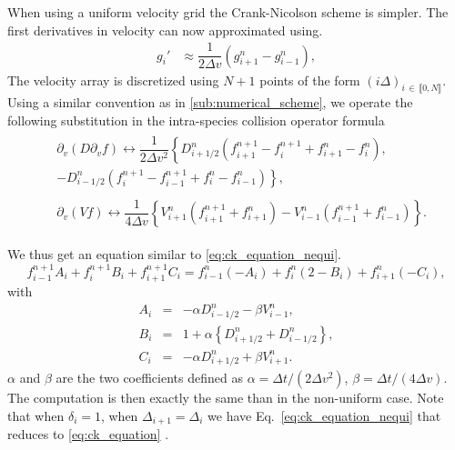 \documentclass[11pt]{article}
\begin{document}
When using a uniform velocity grid the Crank-Nicolson scheme is simpler. The first derivatives in velocity can now approximated using. 
%
\begin{align*}
   g_i' & \approx \dfrac{1}{2 \Delta v} \left( g_{i+1}^{n} - g_{i-1}^{n} \right),   \label{eq:derivativee_scheme}
\end{align*}
The velocity array is discretized using $N +1$ points of the form  $(i\Delta)_{i \, \in \, \llbracket 0, N \rrbracket }$. Using a similar convention as in \cref{sub:numerical_scheme}, we operate the following substitution in the intra-species collision operator formula
%
\begin{align}
 & \begin{aligned}
    \partial_{v} (D \partial_{v}f )\longleftrightarrow \dfrac{1}{2 \Delta v^2}\left\{D_{i + 1/2}^{n}  \left( f_{i+1}^{n+1} - f_{i}^{n+1} + f_{i+1}^{n} - f_{i}^{n} \right) \right., & \\
    - \left. D_{i - 1/2}^{n}\left( f_{i}^{n+1} - f_{i-1}^{n+1} + f_{i}^{n} - f_{i-1}^{n} \right) \right\},
  \end{aligned} \\
 & 
 \begin{aligned}
   \partial_{v} (V f) \longleftrightarrow \dfrac{1}{4 \Delta v} \left\{ V_{i+1}^{n} (f_{i+1}^{n+1} + f_{i+1}^{n}) - V_{i-1}^{n}(f_{i-1}^{n+1} + f_{i-1}^{n}) \right\}.
 \end{aligned}
\end{align}

%
We thus get an equation similar to \cref{eq:ck_equation_nequi}.
%
\begin{equation}\label{eq:ck_equation}
  f_{i-1}^{n+1} A_i + f_i^{n+1} B_i + f_{i+1}^{n+1} C_i = f_{i-1}^{n}(-A_i) + f_i^{n} (2 - B_i) + f_{i+1}^{n}(-C_i),
\end{equation}
%
with
%
\begin{eqnarray}
  A_i &=& - \alpha D^{n}_{i - 1/2} - \beta V^{n}_{i-1}, \\
  B_i &=& 1 + \alpha\left\{D^{n}_{i+1/2} + D^{n}_{i-1/2}\right\}, \\
  C_i &=& - \alpha D^{n}_{i+1/2} + \beta V^{n}_{i+1}.
\end{eqnarray}
%
$\alpha$ and $\beta$ are the two coefficients defined as $\alpha = \Delta t / (2\Delta v^2)$, $\beta = \Delta t /(4\Delta v)$. The computation is then exactly the same than in the non-uniform case.  Note that when $\delta_i = 1$, when $\Delta_{i+1} = \Delta_i$ we have Eq.~\cref{eq:ck_equation_nequi} that reduces to \cref{eq:ck_equation} . 



\newpage
\printbibliography
\end{document}
